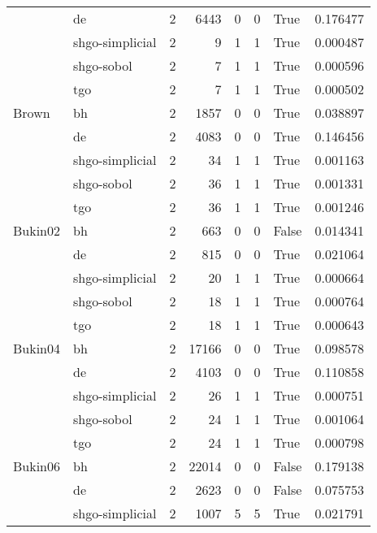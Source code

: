 \begin{longtable}{llrrrrlr}
         & de &     2 &     6443 &      0 &       0 &    True &    0.176477 \\
         & shgo-simplicial &     2 &        9 &      1 &       1 &    True &    0.000487 \\
         & shgo-sobol &     2 &        7 &      1 &       1 &    True &    0.000596 \\
         & tgo &     2 &        7 &      1 &       1 &    True &    0.000502 \\
Brown & bh &     2 &     1857 &      0 &       0 &    True &    0.038897 \\
         & de &     2 &     4083 &      0 &       0 &    True &    0.146456 \\
         & shgo-simplicial &     2 &       34 &      1 &       1 &    True &    0.001163 \\
         & shgo-sobol &     2 &       36 &      1 &       1 &    True &    0.001331 \\
         & tgo &     2 &       36 &      1 &       1 &    True &    0.001246 \\
Bukin02 & bh &     2 &      663 &      0 &       0 &   False &    0.014341 \\
         & de &     2 &      815 &      0 &       0 &    True &    0.021064 \\
         & shgo-simplicial &     2 &       20 &      1 &       1 &    True &    0.000664 \\
         & shgo-sobol &     2 &       18 &      1 &       1 &    True &    0.000764 \\
         & tgo &     2 &       18 &      1 &       1 &    True &    0.000643 \\
Bukin04 & bh &     2 &    17166 &      0 &       0 &    True &    0.098578 \\
         & de &     2 &     4103 &      0 &       0 &    True &    0.110858 \\
         & shgo-simplicial &     2 &       26 &      1 &       1 &    True &    0.000751 \\
         & shgo-sobol &     2 &       24 &      1 &       1 &    True &    0.001064 \\
         & tgo &     2 &       24 &      1 &       1 &    True &    0.000798 \\
Bukin06 & bh &     2 &    22014 &      0 &       0 &   False &    0.179138 \\
         & de &     2 &     2623 &      0 &       0 &   False &    0.075753 \\
         & shgo-simplicial &     2 &     1007 &      5 &       5 &    True &    0.021791 \\

\end{longtable}
